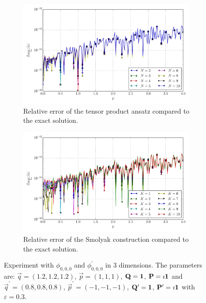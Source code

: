 \documentclass[a4paper,10pt]{article}
\begin{document}
\begin{figure}[ht!]
\begin{subfigure}[t]{0.5\linewidth}
    \includegraphics[width=\linewidth]{./plots/tp_sg_3d_conv_p_(0,0,0)_(0,0,0)_err_rel_nsd_tp.pdf}
    \caption{Relative error of the tensor product ansatz compared to the exact solution.}
    \label{fig:tp_sg_3d_conv_p_000_000_err_rel_nsd_tp}
  \end{subfigure}
  \begin{subfigure}[t]{0.5\linewidth}
    \includegraphics[width=\linewidth]{./plots/tp_sg_3d_conv_p_(0,0,0)_(0,0,0)_err_rel_nsd_gk.pdf}
    \caption{Relative error of the Smolyak construction compared to the exact solution.}
    \label{fig:tp_sg_3d_conv_p_000_000_err_rel_nsd_gk}
  \end{subfigure}
  \label{fig:tp_sg_3d_conv_p_000_000}
  \caption{Experiment with $\phi_{0,0,0}$ and $\phi_{0,0,0}^{\prime}$
  in 3 dimensions.
  The parameters are:
  $\vec{q} = (1.2,1.2,1.2)$,
  $\vec{p} = (1,1,1)$,
  $\mathbf{Q} = \mathbf{1}$,
  $\mathbf{P} = \imath \mathbf{1}$
  and
  $\vec{q}^\prime = (0.8,0.8,0.8)$,
  $\vec{p}^\prime = (-1,-1,-1)$,
  $\mathbf{Q}^\prime = \mathbf{1}$,
  $\mathbf{P}^\prime = \imath \mathbf{1}$
  with $\varepsilon=0.3$.}
\end{figure}
\end{document}
